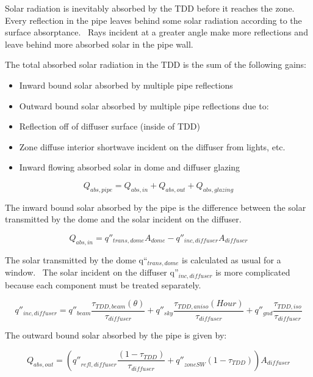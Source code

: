 Solar radiation is inevitably absorbed by the TDD before it reaches the zone.~ Every reflection in the pipe leaves behind some solar radiation according to the surface absorptance.~ Rays incident at a greater angle make more reflections and leave behind more absorbed solar in the pipe wall.

The total absorbed solar radiation in the TDD is the sum of the following gains:

\begin{itemize}
\item
  Inward bound solar absorbed by multiple pipe reflections
\item
  Outward bound solar absorbed by multiple pipe reflections due to:
\item
  Reflection off of diffuser surface (inside of TDD)
\item
  Zone diffuse interior shortwave incident on the diffuser from lights, etc.
\item
  Inward flowing absorbed solar in dome and diffuser glazing
\end{itemize}

\begin{equation}
{Q_{abs,pipe}} = {Q_{abs,in}} + {Q_{abs,out}} + {Q_{abs,glazing}}
\end{equation}

The inward bound solar absorbed by the pipe is the difference between the solar transmitted by the dome and the solar incident on the diffuser.

\begin{equation}
{Q_{abs,in}} = {q''_{trans,dome}}{A_{dome}} - {q''_{inc,diffuser}}{A_{diffuser}}
\end{equation}

The solar transmitted by the dome q``\(_{trans,dome}\) is calculated as usual for a window.~ The solar incident on the diffuser q''\(_{inc,diffuser}\) is more complicated because each component must be treated separately.

\begin{equation}
{q''_{inc,diffuser}} = {q''_{beam}}\frac{{{\tau_{TDD,beam}}(\theta )}}{{{\tau_{diffuser}}}} + {q''_{sky}}\frac{{{\tau_{TDD,aniso}}(Hour)}}{{{\tau_{diffuser}}}} + {q''_{gnd}}\frac{{{\tau_{TDD,iso}}}}{{{\tau_{diffuser}}}}
\end{equation}

The outward bound solar absorbed by the pipe is given by:

\begin{equation}
{Q_{abs,out}} = \left( {{{q''}_{refl,diffuser}}\frac{{\left( {1 - {\tau_{TDD}}} \right)}}{{{\tau_{diffuser}}}} + {{q''}_{zoneSW}}\left( {1 - {\tau_{TDD}}} \right)} \right){A_{diffuser}}
\end{equation}

